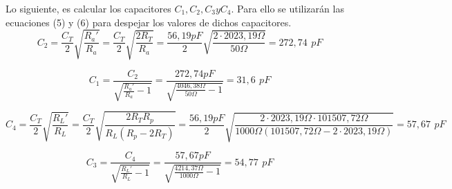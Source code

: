 Lo siguiente, es calcular los capacitores \(C_1, C_2, C_3 y C_4 \). Para ello se utilizarán las ecuaciones (5) y (6) para despejar los valores de dichos capacitores.
\begin{equation}
    C_2 = \frac{C_T}{2}\sqrt{\frac{R_a'}{R_a}} = \frac{C_T}{2}\sqrt{\frac{2R_T}{R_a}} = \frac{56,19pF}{2}\sqrt{\frac{2\cdot2023,19\Omega}{50\Omega}} = 272,74 \,\ pF
\end{equation}

\begin{equation}
    C_1 = \frac{C_2}{\sqrt{\frac{R_a'}{R_a}-1}} = \frac{272,74pF}{\sqrt{\frac{4046,38\Omega}{50\Omega}-1}} = 31,6 \,\ pF
\end{equation}

\begin{equation}
    C_4 = \frac{C_T}{2}\sqrt{\frac{R_L'}{R_L}} = \frac{C_T}{2}\sqrt{\frac{2R_TR_p}{R_L(R_p-2R_T)}} = \frac{56,19pF}{2}\sqrt{\frac{2\cdot2023,19\Omega \cdot 101507,72\Omega}{1000\Omega(101507,72\Omega-2\cdot2023,19\Omega)}} = 57,67 \,\ pF
\end{equation}

\begin{equation}
    C_3 = \frac{C_4}{\sqrt{\frac{R_L'}{R_L}-1}} = \frac{57,67pF}{\sqrt{\frac{4214,37\Omega}{1000\Omega}-1}} = 54,77 \,\ pF
\end{equation}




